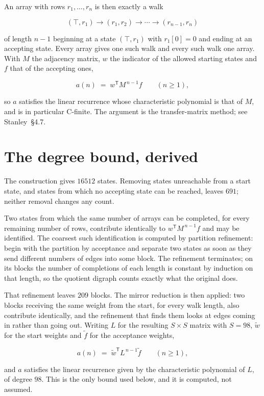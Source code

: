 \documentclass[11pt]{article}
\theoremstyle{definition}
\begin{document}
An array with rows $r_1,\dots,r_n$ is then exactly a walk

\[(\top,r_1) \to (r_1,r_2) \to \cdots \to (r_{n-1},r_n)\]

of length $n-1$ beginning at a state $(\top,r_1)$ with $r_1[0]=0$ and ending at an accepting state. Every array gives one such walk and every such walk one array. With $M$ the adjacency matrix, $w$ the indicator of the allowed starting states and $f$ that of the accepting ones,

\[a(n) \;=\; w^{\mathsf T} M^{\,n-1} f \qquad (n \ge 1),\]

so $a$ satisfies the linear recurrence whose characteristic polynomial is that of $M$, and is in particular C-finite. The argument is the transfer-matrix method; see Stanley~\S4.7.

\section{The degree bound, derived}

The construction gives $16512$ states. Removing states unreachable from a start state, and states from which no accepting state can be reached, leaves $691$; neither removal changes any count.

Two states from which the same number of arrays can be completed, for every remaining number of rows, contribute identically to $w^{\mathsf T}M^{\,n-1}f$ and may be identified. The coarsest such identification is computed by partition refinement: begin with the partition by acceptance and separate two states as soon as they send different numbers of edges into some block. The refinement terminates; on its blocks the number of completions of each length is constant by induction on that length, so the quotient digraph counts exactly what the original does.

That refinement leaves $209$ blocks. The mirror reduction is then applied: two blocks receiving the same weight from the start, for every walk length, also contribute identically, and the refinement that finds them looks at edges coming in rather than going out. Writing $L$ for the resulting $S \times S$ matrix with $S = 98$, $\tilde w$ for the start weights and $\tilde f$ for the acceptance weights,

\[a(n) \;=\; \tilde w^{\mathsf T} L^{\,n-1} \tilde f \qquad (n \ge 1),\]

and $a$ satisfies the linear recurrence given by the characteristic polynomial of $L$, of degree $98$. This is the only bound used below, and it is computed, not assumed.
\end{document}
